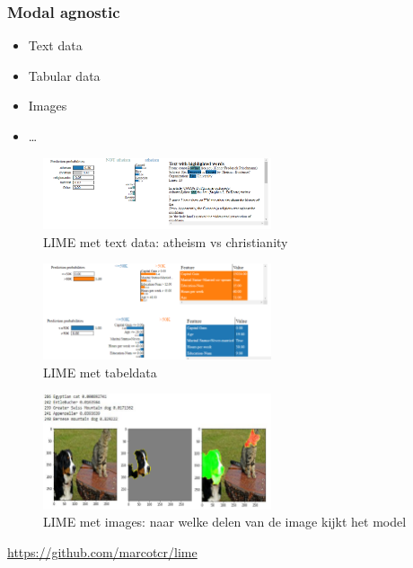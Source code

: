 \documentclass{article}
\begin{document}
\subsubsection{Modal agnostic}

\begin{itemize}
    \item Text data
    \item Tabular data
    \item Images
    \item \dots
\end{itemize}

\begin{figure}[H]
    \centering
    \includegraphics[width=0.6\textwidth]{lime-text.png}
    \caption{LIME met text data: atheism vs christianity}
\end{figure}

\begin{figure}[H]
    \centering
    \includegraphics[width=0.6\textwidth]{lime-tabular.png}
    \caption{LIME met tabeldata}
\end{figure}

\begin{figure}[H]
    \centering
    \includegraphics[width=0.6\textwidth]{lime-images.png}
    \caption{LIME met images: naar welke delen van de image kijkt het model}
\end{figure}

\url{https://github.com/marcotcr/lime}
\end{document}
